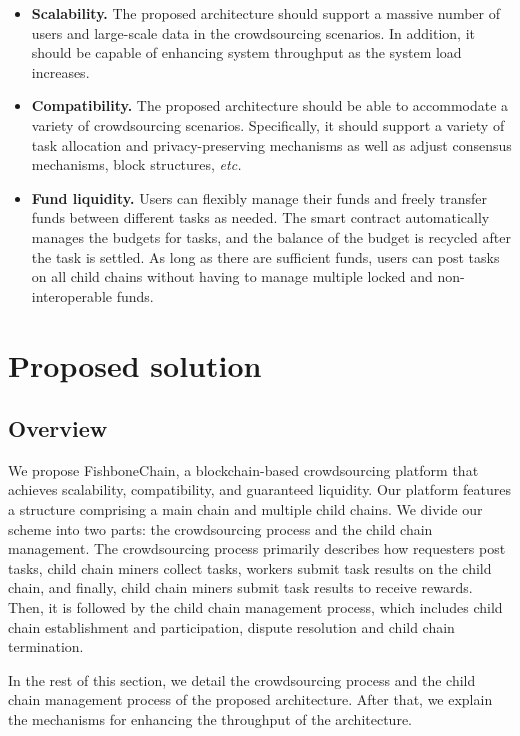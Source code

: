 \documentclass[10pt,journal]{IEEEtran}
\begin{document}
\begin{itemize}
    \item \textbf{Scalability.}
          The proposed architecture should support a massive number of users and large-scale data in the crowdsourcing scenarios. In addition, it should be capable of enhancing system throughput as the system load increases.
    \item \textbf{Compatibility.}
          The proposed architecture should be able to accommodate a variety of crowdsourcing scenarios. Specifically, it should support a variety of task allocation and privacy-preserving mechanisms as well as adjust consensus mechanisms, block structures, \textit{etc.}
    \item \textbf{Fund liquidity.}
          Users can flexibly manage their funds and freely transfer funds between different tasks as needed. The smart contract automatically manages the budgets for tasks, and the balance of the budget is recycled after the task is settled. As long as there are sufficient funds, users can post tasks on all child chains without having to manage multiple locked and non-interoperable funds.
\end{itemize}


\section{Proposed solution}\label{section:solution}

\subsection{Overview} \label{subsec:overview}

We propose FishboneChain, a blockchain-based crowdsourcing platform that achieves scalability, compatibility, and guaranteed liquidity. Our platform features a structure comprising a main chain and multiple child chains. We divide our scheme into two parts: the crowdsourcing process and the child chain management. The crowdsourcing process primarily describes how requesters post tasks, child chain miners collect tasks, workers submit task results on the child chain, and finally, child chain miners submit task results to receive rewards. Then, it is followed by the child chain management process, which includes child chain establishment and participation, dispute resolution and child chain termination.

In the rest of this section, we detail the crowdsourcing process and the child chain management process of the proposed architecture. After that, we explain the mechanisms for enhancing the throughput of the architecture.
\end{document}
